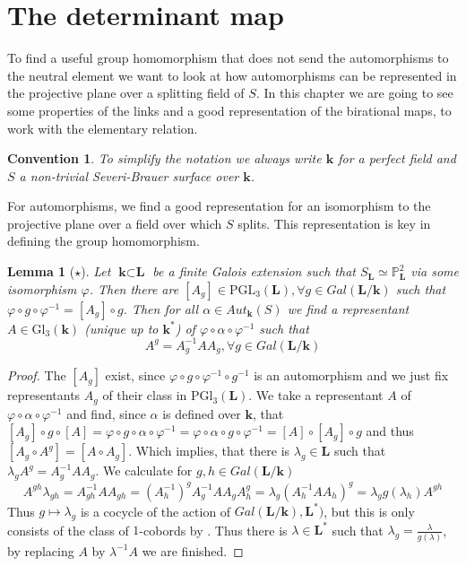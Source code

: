 \documentclass[12pt, oneside, reqno]{amsart}
\newtheorem{lemma}[theorem]{Lemma}
\newtheorem{convention}[theorem]{Convention}
\begin{document}
\section{The determinant map}
\noindent To find a useful group homomorphism that does not send the automorphisms to the neutral element we want to look at how automorphisms can be represented in the projective plane over a splitting field of $S$. In this chapter we are going to see some properties of the links and a good representation of the birational maps, to work with the elementary relation.
\begin{convention}
    To simplify the notation we always write $\textbf{k}$ for a perfect field and $S$ a non-trivial Severi-Brauer surface over $\textbf{k}$. 
\end{convention}
\noindent
For automorphisms, we find a good representation for an isomorphism to the projective plane over a field over which $S$ splits. This representation is key in defining the group homomorphism.
\begin{lemma}[$\star$] \label{AutRep}
    Let $\textbf{k} \subset \textbf{L}$ be a finite Galois extension such that $S_{\textbf{L}} \simeq \mathbb{P}^2_{\textbf{L}}$ via some isomorphism $\varphi$. Then there are $[A_g] \in \mathrm{PGL}_3(\textbf{L}), \forall g \in Gal(\textbf{L}/\textbf{k})$ such that $\varphi \circ g \circ \varphi^{-1} = [A_g] \circ g$. Then for all $\alpha \in Aut_{\textbf{k}}(S)$ we find a representant $A \in \mathrm{Gl}_3(\textbf{k})$ (unique up to $\textbf{k}^*$) of $\varphi \circ \alpha \circ \varphi^{-1}$ such that 
    \begin{equation} \label{eq:Rep}
        A^g = A_g^{-1}AA_g, \forall g \in Gal(\textbf{L}/\textbf{k})
    \end{equation}
\end{lemma}
\begin{proof}
    The $[A_g]$ exist, since $\varphi \circ g \circ \varphi^{-1} \circ g^{-1}$ is an automorphism and we just fix representants $A_g$ of their class in $\mathrm{PGl}_3(\textbf{L})$. We take a representant $A$ of  $\varphi \circ \alpha \circ \varphi^{-1}$ and find, since $\alpha$ is defined over $\textbf{k}$, that $[A_g] \circ g \circ [A] = \varphi \circ g \circ \alpha \circ \varphi^{-1} = \varphi \circ \alpha \circ g \circ \varphi^{-1} = [A] \circ [A_g] \circ g$ and thus $[A_g \circ A^g] = [A \circ A_g]$. Which implies, that there is $\lambda_g \in \textbf{L}$ such that $\lambda_g A^g = A_g^{-1} A A_g$. We calculate for $g,h \in Gal(\textbf{L}/ \textbf{k})$ 
    \[A^{gh} \lambda_{gh} = A_{gh}^{-1} A A_{gh} = (A_h^{-1})^g A_g^{-1} A A_g A_h^g = \lambda_g (A_h^{-1} A A_h)^g = \lambda_g g(\lambda_h) A^{gh}\]
    Thus $g \mapsto \lambda_g$ is a cocycle of the action of $Gal(\textbf{L}/\textbf{k}),\textbf{L}^*)$, but this is only consists of the class of $1$-cobords by \cite{serre2004corps}. Thus there is $\lambda \in \textbf{L}^*$ such that $\lambda_g = \frac{\lambda}{g(\lambda)}$, by replacing $A$ by $\lambda^{-1} A$ we are finished.
\end{proof}
\end{document}
